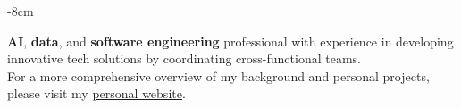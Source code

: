 \documentclass[10pt,a4paper]{altacv}
\begin{document}






\begin{adjustwidth}{}{-8cm}
\makecvheader
\end{adjustwidth}

\textbf{AI}, \textbf{data}, and \textbf{software engineering} professional with experience in developing innovative tech solutions by coordinating cross-functional teams. 
\\For a more comprehensive overview of my background and personal projects, please visit my \href{your website}{personal website}.




\end{document}
